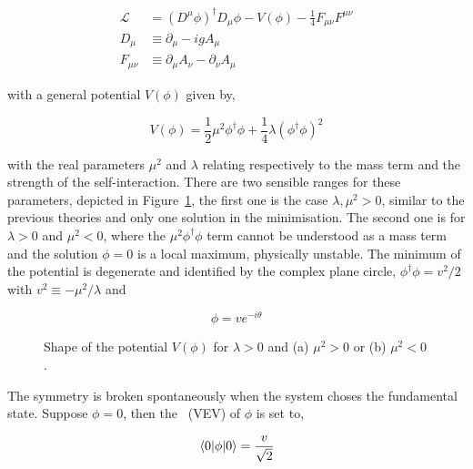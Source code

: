 \begin{equation}
    \begin{split}
    \mathcal{L}_{\ \ }&=(D^\mu\phi)^\dag D_\mu\phi - V(\phi) - \frac{1}{4}F_{\mu\nu}F^{\mu\nu}\\
    D_{\mu \ } &\equiv \partial_\mu - igA_\mu\\
    F_{\mu\nu}&\equiv\partial_\mu A_\nu - \partial_\nu A_\mu
    \end{split}
\end{equation}

with a general potential $V(\phi)$ given by,

\begin{equation}
    V(\phi) = \frac{1}{2}\mu^2\phi^\dag\phi + \frac{1}{4}\lambda(\phi^\dag\phi)^2
\end{equation}

with the real parameters $\mu^2$ and $\lambda$ relating respectively to the mass term and the strength of the self-interaction.
There are two sensible ranges for these parameters, depicted in Figure~\ref{figSM:higgspotential}, the first one is the case $\lambda,\mu^2>0$,
similar to the previous theories and only one solution in the minimisation.
The second one is for $\lambda>0$ and $\mu^2<0$, where the $\mu^2\phi^\dag\phi$ term cannot be understood as a mass term and
the solution $\phi=0$ is a local maximum, physically unstable. The minimum of the potential is degenerate and identified by the complex
plane circle, $\phi^\dag\phi=v^2/2$ with $v^2\equiv-\mu^2/\lambda$ and

\begin{equation}
    \phi = v e^{-i\theta}
\end{equation}

\begin{figure}[htbp]
    \RawFloats
    \begin{center}
    \qquad
    \caption{Shape of the potential $V(\phi)$ for $\lambda>0$ and (a) $\mu^2>0$ or (b) $\mu^2<0$.
    }
    \label{figSM:higgspotential}
    \end{center}
\end{figure}

The symmetry is broken spontaneously when the system choses the fundamental state. Suppose $\phi=0$, then the \textit{}~(\acrshort{VEV})
of $\phi$ is set to,

\begin{equation}
    \expval{\phi}{0} = \frac{v}{\sqrt{2}}
\end{equation}

